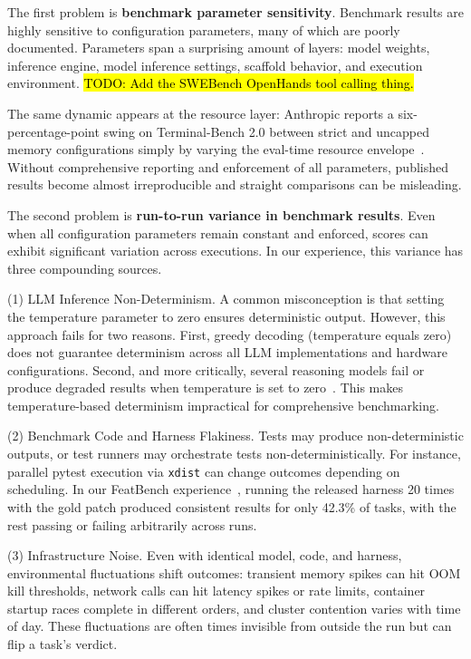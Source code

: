 \documentclass{IEEEcsmag}
\begin{document}
The first problem is \textbf{benchmark parameter sensitivity}. Benchmark results are highly sensitive to configuration parameters, many of which are poorly documented. Parameters span a surprising amount of layers: model weights, inference engine, model inference settings, scaffold behavior, and execution environment. \hl{TODO: Add the SWEBench OpenHands tool calling thing.}

The same dynamic appears at the resource layer: Anthropic reports a six-percentage-point swing on Terminal-Bench 2.0 between strict and uncapped memory configurations simply by varying the eval-time resource envelope~\cite{anthropic2026noise}. Without comprehensive reporting and enforcement of all parameters, published results become almost irreproducible and straight comparisons can be misleading.

The second problem is \textbf{run-to-run variance in benchmark results}. Even when all configuration parameters remain constant and enforced, scores can exhibit significant variation across executions. In our experience, this variance has three compounding sources.

\smallskip \noindent (1) LLM Inference Non-Determinism. A common misconception is that setting the temperature parameter to zero ensures deterministic output. However, this approach fails for two reasons. First, greedy decoding (temperature equals zero) does not guarantee determinism across all LLM implementations and hardware configurations. Second, and more critically, several reasoning models fail or produce degraded results when temperature is set to zero~\cite{pipis2025wait}. This makes temperature-based determinism impractical for comprehensive benchmarking.

\smallskip \noindent (2) Benchmark Code and Harness Flakiness. Tests may produce non-deterministic outputs, or test runners may orchestrate tests non-deterministically. For instance, parallel pytest execution via \texttt{xdist} can change outcomes depending on scheduling. In our FeatBench experience~\cite{shayanfar2026benchmark}, running the released harness 20 times with the gold patch produced consistent results for only 42.3\% of tasks, with the rest passing or failing arbitrarily across runs.

\smallskip \noindent (3) Infrastructure Noise. Even with identical model, code, and harness, environmental fluctuations shift outcomes: transient memory spikes can hit OOM kill thresholds, network calls can hit latency spikes or rate limits, container startup races complete in different orders, and cluster contention varies with time of day. These fluctuations are often times invisible from outside the run but can flip a task's verdict.
\end{document}
